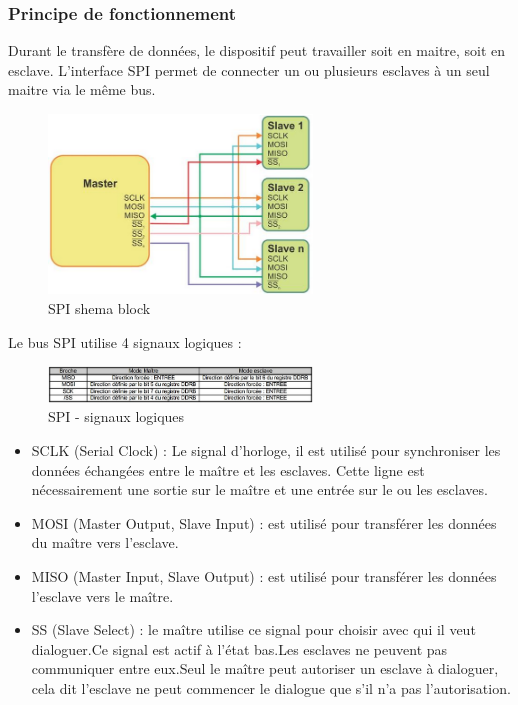 \documentclass[french,a4paper,12pt]{report}
\begin{document}
			\subsubsection{Principe de fonctionnement}
			
			Durant le transfère de données, le dispositif peut travailler soit en maitre, soit en esclave. L'interface SPI permet de connecter un ou plusieurs esclaves à un seul maitre via le même bus.
			
	\begin{figure}[!ht]
    \center
  	\includegraphics[width=7cm]{SPI1.png}
    \caption{SPI shema block}
	\end{figure}	
 
 
	Le bus SPI utilise 4 signaux logiques :
 
	\begin{figure}[!ht]
    \center
  	\includegraphics[width=7cm]{SPI2.png}
    \caption{SPI - signaux logiques}
	\end{figure}	
 
	\begin{itemize}
	\item SCLK (Serial Clock) : Le signal d'horloge, il est utilisé pour synchroniser les données échangées entre le maître et 	les esclaves. Cette ligne est nécessairement une sortie sur le maître et une entrée sur le ou les esclaves.
 
	\item MOSI (Master Output, Slave Input) : est utilisé pour transférer les données du maître vers l'esclave.
 
	\item MISO (Master Input, Slave Output) : est utilisé pour transférer les données l'esclave vers le maître.
 
	\item SS (Slave Select) : le maître utilise ce signal pour choisir avec qui il veut dialoguer.Ce signal est actif à l'état bas.Les esclaves ne peuvent pas communiquer entre eux.Seul le maître peut autoriser un esclave à dialoguer, cela dit l'esclave ne peut commencer le dialogue que s'il n'a pas l'autorisation.
\end{itemize}
 
\end{document}
